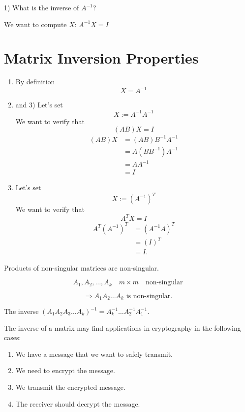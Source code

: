 1) What is the inverse of $A^{-1}$?

We want to compute $X$: $A^{-1}X = I$

\section{Matrix Inversion Properties}

\begin{enumerate}
    \item By definition
    \[ X = A^{-1} \]
    
    \item and 3) Let's set
    \[ X := A^{-1}A^{-1} \]
    We want to verify that
    \[ (AB)X = I \]
    \begin{align*}
        (AB)X &= (AB)B^{-1}A^{-1} \\
        &= A(BB^{-1})A^{-1} \\
        &= AA^{-1} \\
        &= I
    \end{align*}
    
    \item Let's set
    \[ X := (A^{-1})^T \]
    We want to verify that
    \[ A^TX = I \]
    \begin{align*}
        A^T(A^{-1})^T &= (A^{-1}A)^T \\
        &= (I)^T \\
        &= I.
    \end{align*}
\end{enumerate}

Products of non-singular matrices are non-singular.

\[ A_1, A_2, \ldots, A_k \quad m \times m \quad \text{non-singular} \]

\[\Rightarrow A_1A_2 \ldots A_k \text{ is non-singular.} \]



The inverse $(A_1 A_2 A_3 \ldots A_k)^{-1} = A_k^{-1} \ldots A_2^{-1} A_1^{-1}$.

The inverse of a matrix may find applications in cryptography in the following cases:

\begin{enumerate}
    \item We have a message that we want to safely transmit.
    \item We need to encrypt the message.
    \item We transmit the encrypted message.
    \item The receiver should decrypt the message.
\end{enumerate}

